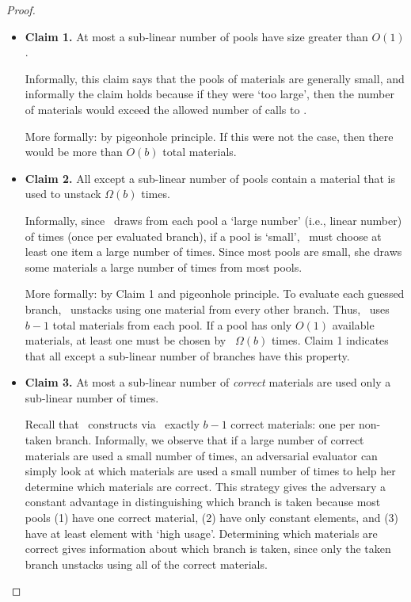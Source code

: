 \begin{proof}
\begin{itemize}
  \item \textbf{Claim 1.} At most a sub-linear number of pools have
    size greater than $O(1)$.
    \begin{subproof}
      Informally, this claim says that the pools of materials are
      generally small, and informally the claim holds because if they
      were `too large', then the number of materials would exceed the
      allowed number of calls to \Gb.

      More formally: by pigeonhole principle.
      If this were not the case, then there
      would be more than $O(b)$ total materials.
    \end{subproof}

  \item \textbf{Claim 2.}
    All except a sub-linear number of pools contain a material that is
    used to unstack $\Omega(b)$ times.
    \begin{subproof}
      Informally, since \Eval\ draws from each pool a `large number'
      (i.e., linear number) of times (once per evaluated branch),
      if a pool is `small', \Eval\ must choose at least one item  a
      large number of times. Since most pools are small, she draws
      some materials a large number of times from most pools.

      More formally: by Claim 1 and pigeonhole principle. To evaluate
      each guessed branch, \Eval\ unstacks using one material from every other
      branch.  Thus, \Eval\ uses $b-1$ total materials from each pool.
      If a pool has only $O(1)$ available materials, at least one
      must be chosen by \Eval\ $\Omega(b)$ times. Claim 1
      indicates that all except a sub-linear number of branches have
      this property.
    \end{subproof}

  \item \textbf{Claim 3.} At most a sub-linear number of
    \emph{correct} materials are used only a sub-linear number of times.
  \begin{subproof}
    Recall that \Eval\ constructs via \Gb\ exactly $b-1$ correct
    materials: one per non-taken branch.
    Informally, we observe that if a large number
    of correct materials are used a small number of times, an
    adversarial evaluator can simply look at which materials are used
    a small number of times to help her determine which materials are
    correct.
    This strategy gives the adversary a constant advantage in
    distinguishing which branch is taken because most pools (1) have
    one correct material, (2) have only constant elements, and (3) have
    at least element with `high usage'.
    Determining which materials are correct gives information about
    which branch is taken, since only the taken branch unstacks using
    all of the correct materials.


\end{subproof}
\end{itemize}
\end{proof}

